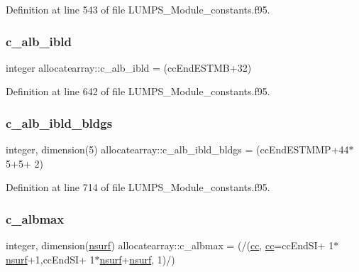 Definition at line 543 of file L\+U\+M\+P\+S\+\_\+\+Module\+\_\+constants.\+f95.

\mbox{\label{namespaceallocatearray_ad603c0d1d8d800628db261e14e19a9fb}} 
\subsubsection{\texorpdfstring{c\+\_\+alb\+\_\+ibld}{c\_alb\_ibld}}
{\footnotesize\ttfamily integer allocatearray\+::c\+\_\+alb\+\_\+ibld = (cc\+End\+E\+S\+T\+MB+32)}



Definition at line 642 of file L\+U\+M\+P\+S\+\_\+\+Module\+\_\+constants.\+f95.

\mbox{\label{namespaceallocatearray_ada09598f015c239e9865188f8d58d9af}} 
\subsubsection{\texorpdfstring{c\+\_\+alb\+\_\+ibld\+\_\+bldgs}{c\_alb\_ibld\_bldgs}}
{\footnotesize\ttfamily integer, dimension(5) allocatearray\+::c\+\_\+alb\+\_\+ibld\+\_\+bldgs = (cc\+End\+E\+S\+T\+M\+MP+44$\ast$5+5+ 2)}



Definition at line 714 of file L\+U\+M\+P\+S\+\_\+\+Module\+\_\+constants.\+f95.

\mbox{\label{namespaceallocatearray_af832f9ed003852e1fcd849c6de9196fd}} 
\subsubsection{\texorpdfstring{c\+\_\+albmax}{c\_albmax}}
{\footnotesize\ttfamily integer, dimension(\hyperlink{namespaceallocatearray_acd22f92a06f7e9a2a91426b3dc99fdb0}{nsurf}) allocatearray\+::c\+\_\+albmax = (/(\hyperlink{namespaceallocatearray_ac863c81704eb507dee10f5e10741e10c}{cc}, \hyperlink{namespaceallocatearray_ac863c81704eb507dee10f5e10741e10c}{cc}=cc\+End\+SI+ 1$\ast$\hyperlink{namespaceallocatearray_acd22f92a06f7e9a2a91426b3dc99fdb0}{nsurf}+1,cc\+End\+SI+ 1$\ast$\hyperlink{namespaceallocatearray_acd22f92a06f7e9a2a91426b3dc99fdb0}{nsurf}+\hyperlink{namespaceallocatearray_acd22f92a06f7e9a2a91426b3dc99fdb0}{nsurf}, 1)/)}



